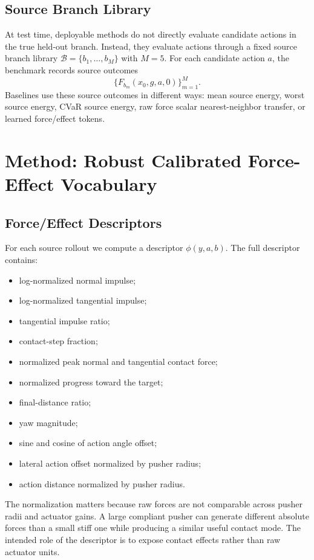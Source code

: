 \documentclass{article}
\newcommand{\branches}{\mathcal{B}}
\newcommand{\features}{\phi}
\begin{document}
\subsection{Source Branch Library}

At test time, deployable methods do not directly evaluate candidate actions in the true held-out branch. Instead, they evaluate actions through a fixed source branch library $\branches=\{b_1,\ldots,b_M\}$ with $M=5$. For each candidate action $a$, the benchmark records source outcomes
\[
  \{F_{b_m}(x_0,g,a,0)\}_{m=1}^M.
\]
Baselines use these source outcomes in different ways: mean source energy, worst source energy, CVaR source energy, raw force scalar nearest-neighbor transfer, or learned force/effect tokens.

\section{Method: Robust Calibrated Force-Effect Vocabulary}

\subsection{Force/Effect Descriptors}

For each source rollout we compute a descriptor $\features(y,a,b)$. The full descriptor contains:

\begin{itemize}
\item log-normalized normal impulse;
\item log-normalized tangential impulse;
\item tangential impulse ratio;
\item contact-step fraction;
\item normalized peak normal and tangential contact force;
\item normalized progress toward the target;
\item final-distance ratio;
\item yaw magnitude;
\item sine and cosine of action angle offset;
\item lateral action offset normalized by pusher radius;
\item action distance normalized by pusher radius.
\end{itemize}

The normalization matters because raw forces are not comparable across pusher radii and actuator gains. A large compliant pusher can generate different absolute forces than a small stiff one while producing a similar useful contact mode. The intended role of the descriptor is to expose contact effects rather than raw actuator units.
\end{document}
